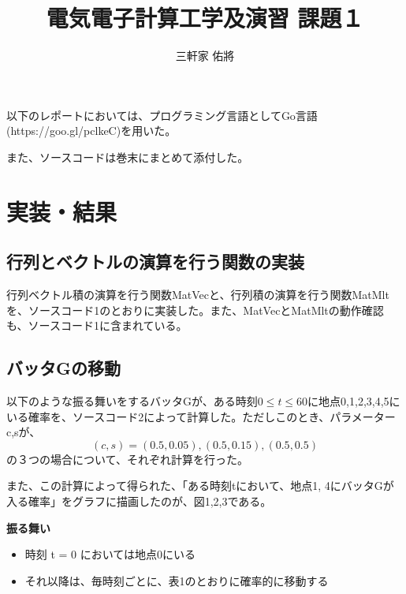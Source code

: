 \documentclass[11pt]{ltjsarticle}
\title{電気電子計算工学及演習 課題１}
\author{三軒家 佑將}
\date{}
\begin{document}
\maketitle


以下のレポートにおいては、プログラミング言語としてGo言語(https://goo.gl/pclkeC)を用いた。

また、ソースコードは巻末にまとめて添付した。

\section{実装・結果}
\subsection{行列とベクトルの演算を行う関数の実装}
	行列ベクトル積の演算を行う関数MatVecと、行列積の演算を行う関数MatMltを、ソースコード1のとおりに実装した。また、MatVecとMatMltの動作確認も、ソースコード1に含まれている。

\subsection{バッタGの移動}
以下のような振る舞いをするバッタGが、ある時刻$0 \leq t \leq 60$に地点0,1,2,3,4,5にいる確率を、ソースコード2によって計算した。ただしこのとき、パラメーターc,sが、
\[
	(c,s) = (0.5, 0.05), (0.5, 0.15), (0.5, 0.5)
\]
の３つの場合について、それぞれ計算を行った。

また、この計算によって得られた、「ある時刻tにおいて、地点1, 4にバッタGが入る確率」をグラフに描画したのが、図1,2,3である。


{\bf 振る舞い}
\begin{itemize}
	\item 時刻 t = 0 においては地点0にいる
	\item それ以降は、毎時刻ごとに、表1のとおりに確率的に移動する
\end{itemize}
\end{document}
